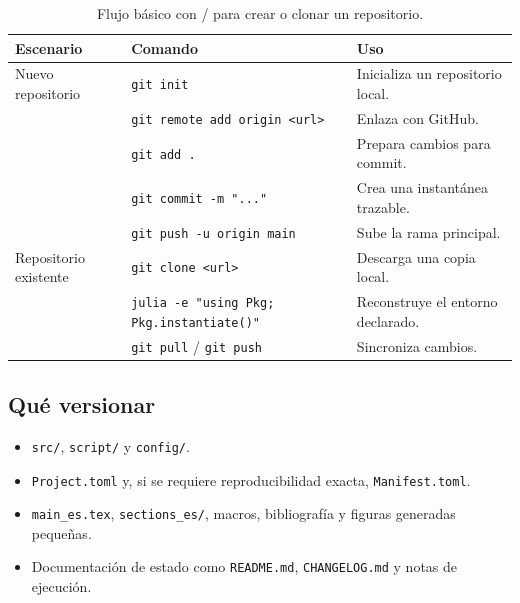 \begin{fullwidth}
\begin{table}[H]
\centering
\small
\caption{Flujo básico con \Git{}/\GitHub{} para crear o clonar un repositorio.}
\label{tab:github-workflow}
\begin{tabular}{@{}p{0.22\fulltextwidth}p{0.30\fulltextwidth}p{0.38\fulltextwidth}@{}}
\toprule
\textbf{Escenario} & \textbf{Comando} & \textbf{Uso} \\
\midrule
Nuevo repositorio & \texttt{git init} & Inicializa un repositorio local. \\
 & \texttt{git remote add origin <url>} & Enlaza con GitHub. \\
 & \texttt{git add .} & Prepara cambios para commit. \\
 & \texttt{git commit -m "..."} & Crea una instantánea trazable. \\
 & \texttt{git push -u origin main} & Sube la rama principal. \\
\addlinespace
Repositorio existente & \texttt{git clone <url>} & Descarga una copia local. \\
 & \texttt{julia -e "using Pkg; Pkg.instantiate()"} & Reconstruye el entorno \Julia{} declarado. \\
 & \texttt{git pull} / \texttt{git push} & Sincroniza cambios. \\
\bottomrule
\end{tabular}
\end{table}
\end{fullwidth}

\subsection{Qué versionar}

\begin{tcolorbox}[
  enhanced,
  breakable,
  colback=NSGray,
  colframe=NSLine,
  boxrule=0.5pt,
  arc=1.5mm,
  title=\textbf{Contenido recomendado para commit}
]
\footnotesize
\begin{itemize}[leftmargin=*,itemsep=2pt,topsep=2pt]
\item \texttt{src/}, \texttt{script/} y \texttt{config/}.
\item \texttt{Project.toml} y, si se requiere reproducibilidad exacta, \texttt{Manifest.toml}.
\item \texttt{main\_es.tex}, \texttt{sections\_es/}, macros, bibliografía y figuras generadas pequeñas.
\item Documentación de estado como \texttt{README.md}, \texttt{CHANGELOG.md} y notas de ejecución.
\end{itemize}
\end{tcolorbox}

